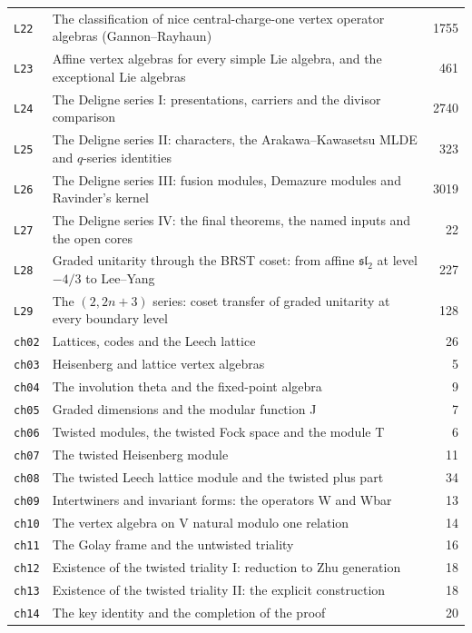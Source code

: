 {\begin{longtable}{l>{\raggedright\arraybackslash}p{}r}
\texttt{L22} & The classification of nice central-charge-one vertex operator algebras (Gannon--Rayhaun) & 1755 \\
\texttt{L23} & Affine vertex algebras for every simple Lie algebra, and the exceptional Lie algebras & 461 \\
\texttt{L24} & The Deligne series I: presentations, carriers and the divisor comparison & 2740 \\
\texttt{L25} & The Deligne series II: characters, the Arakawa--Kawasetsu MLDE and $q$-series identities & 323 \\
\texttt{L26} & The Deligne series III: fusion modules, Demazure modules and Ravinder's kernel & 3019 \\
\texttt{L27} & The Deligne series IV: the final theorems, the named inputs and the open cores & 22 \\
\texttt{L28} & Graded unitarity through the BRST coset: from affine $\mathfrak{sl}_2$ at level $-4/3$ to Lee--Yang & 227 \\
\texttt{L29} & The $(2,2n+3)$ series: coset transfer of graded unitarity at every boundary level & 128 \\
\texttt{ch02} & Lattices, codes and the Leech lattice & 26 \\
\texttt{ch03} & Heisenberg and lattice vertex algebras & 5 \\
\texttt{ch04} & The involution theta and the fixed-point algebra & 9 \\
\texttt{ch05} & Graded dimensions and the modular function J & 7 \\
\texttt{ch06} & Twisted modules, the twisted Fock space and the module T & 6 \\
\texttt{ch07} & The twisted Heisenberg module & 11 \\
\texttt{ch08} & The twisted Leech lattice module and the twisted plus part & 34 \\
\texttt{ch09} & Intertwiners and invariant forms: the operators W and Wbar & 13 \\
\texttt{ch10} & The vertex algebra on V natural modulo one relation & 14 \\
\texttt{ch11} & The Golay frame and the untwisted triality & 16 \\
\texttt{ch12} & Existence of the twisted triality I: reduction to Zhu generation & 18 \\
\texttt{ch13} & Existence of the twisted triality II: the explicit construction & 18 \\
\texttt{ch14} & The key identity and the completion of the proof & 20 \\

\end{longtable}}
